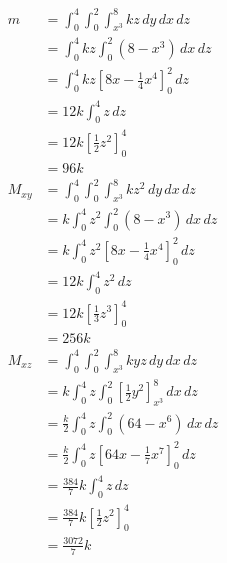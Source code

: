 \documentclass{article}
\begin{document}
\begin{align*}
  m       & = \int_0^4 \int_0^2 \int_{x^3}^8 k z \,dy \,dx \,dz                      \\
          & = \int_0^4 k z \int_0^2 (8 - x^3) \,dx \,dz                              \\
          & = \int_0^4 k z \left[ 8 x - \frac{1}{4} x^4 \right]_0^2 \,dz             \\
          & = 12 k \int_0^4 z \,dz                                                   \\
          & = 12 k \left[ \frac{1}{2} z^2 \right]_0^4                                \\
          & = 96 k                                                                   \\
  M_{x y} & = \int_0^4 \int_0^2 \int_{x^3}^8 k z^2 \,dy \,dx \,dz                    \\
          & = k \int_0^4 z^2 \int_0^2 (8 - x^3) \,dx \,dz                            \\
          & = k \int_0^4 z^2 \left[ 8 x - \frac{1}{4} x^4 \right]_0^2 \,dz           \\
          & = 12 k \int_0^4 z^2 \,dz                                                 \\
          & = 12 k \left[ \frac{1}{3} z^3 \right]_0^4                                \\
          & = 256 k                                                                  \\
  M_{x z} & = \int_0^4 \int_0^2 \int_{x^3}^8 k y z \,dy \,dx \,dz                    \\
          & = k \int_0^4 z \int_0^2 \left[ \frac{1}{2} y^2 \right]_{x^3}^8 \,dx \,dz \\
          & = \frac{k}{2} \int_0^4 z \int_0^2 (64 - x^6) \,dx \,dz                   \\
          & = \frac{k}{2} \int_0^4 z \left[ 64 x - \frac{1}{7} x^7 \right]_0^2 \,dz  \\
          & = \frac{384}{7} k \int_0^4 z \,dz                                        \\
          & = \frac{384}{7} k \left[ \frac{1}{2} z^2 \right]_0^4                     \\
          & = \frac{3072}{7} k
\end{align*}
\end{document}
